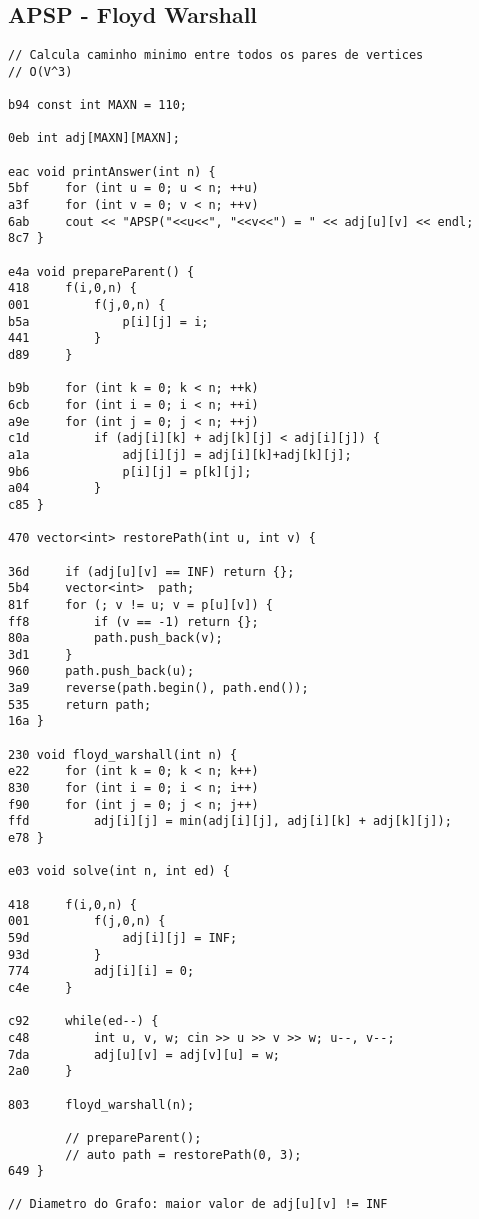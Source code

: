 \documentclass[11pt, a4paper, twoside]{article}
\begin{document}
\subsection{APSP - Floyd Warshall}
\begin{lstlisting}
// Calcula caminho minimo entre todos os pares de vertices
// O(V^3)

b94 const int MAXN = 110;

0eb int adj[MAXN][MAXN];

eac void printAnswer(int n) {
5bf 	for (int u = 0; u < n; ++u)
a3f 	for (int v = 0; v < n; ++v)
6ab 	cout << "APSP("<<u<<", "<<v<<") = " << adj[u][v] << endl;
8c7 }

e4a void prepareParent() {
418 	f(i,0,n) {
001 		f(j,0,n) {
b5a 			p[i][j] = i;
441 		}
d89 	}
    
b9b 	for (int k = 0; k < n; ++k)
6cb 	for (int i = 0; i < n; ++i)
a9e 	for (int j = 0; j < n; ++j)
c1d 		if (adj[i][k] + adj[k][j] < adj[i][j]) {
a1a 			adj[i][j] = adj[i][k]+adj[k][j];
9b6 			p[i][j] = p[k][j];
a04 		}
c85 }

470 vector<int> restorePath(int u, int v) {
    
36d 	if (adj[u][v] == INF) return {};
5b4 	vector<int>  path;
81f 	for (; v != u; v = p[u][v]) {
ff8 		if (v == -1) return {};
80a 		path.push_back(v);
3d1 	}
960 	path.push_back(u);
3a9 	reverse(path.begin(), path.end());
535 	return path;
16a }

230 void floyd_warshall(int n) {
e22 	for (int k = 0; k < n; k++)
830 	for (int i = 0; i < n; i++)
f90 	for (int j = 0; j < n; j++)
ffd 		adj[i][j] = min(adj[i][j], adj[i][k] + adj[k][j]);
e78 }

e03 void solve(int n, int ed) {
    
418 	f(i,0,n) {
001 		f(j,0,n) {
59d 			adj[i][j] = INF;
93d 		}
774 		adj[i][i] = 0;
c4e 	}
    
c92 	while(ed--) {
c48 		int u, v, w; cin >> u >> v >> w; u--, v--;
7da 		adj[u][v] = adj[v][u] = w;
2a0 	}
    
803 	floyd_warshall(n);
    
    	// prepareParent();
    	// auto path = restorePath(0, 3);
649 }

// Diametro do Grafo: maior valor de adj[u][v] != INF
\end{lstlisting}
\end{document}
